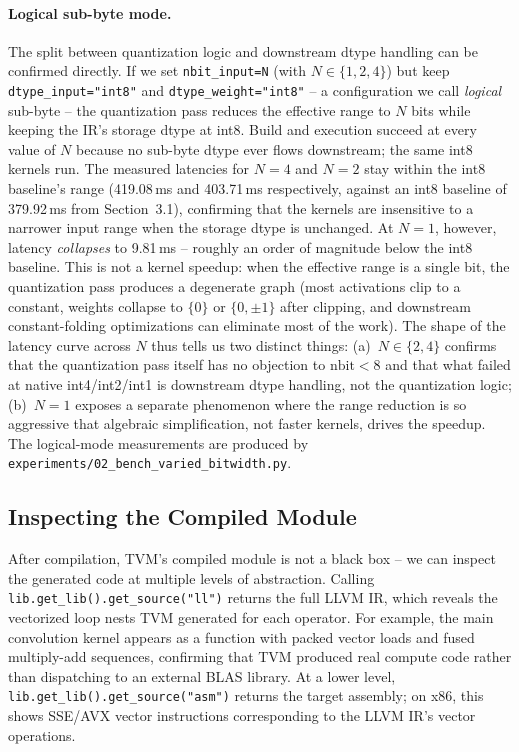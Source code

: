 \documentclass[11pt,a4paper]{article}
\begin{document}
\paragraph{Logical sub-byte mode.} The split between quantization logic and downstream dtype handling can be confirmed directly. If we set \texttt{nbit\_input=N} (with $N \in \{1,2,4\}$) but keep \texttt{dtype\_input="int8"} and \texttt{dtype\_weight="int8"} -- a configuration we call \emph{logical} sub-byte -- the quantization pass reduces the effective range to $N$ bits while keeping the IR's storage dtype at int8. Build and execution succeed at every value of $N$ because no sub-byte dtype ever flows downstream; the same int8 kernels run. The measured latencies for $N=4$ and $N=2$ stay within the int8 baseline's range (419.08\,ms and 403.71\,ms respectively, against an int8 baseline of 379.92\,ms from Section~3.1), confirming that the kernels are insensitive to a narrower input range when the storage dtype is unchanged. At $N=1$, however, latency \emph{collapses} to 9.81\,ms -- roughly an order of magnitude below the int8 baseline. This is not a kernel speedup: when the effective range is a single bit, the quantization pass produces a degenerate graph (most activations clip to a constant, weights collapse to $\{0\}$ or $\{0,\pm 1\}$ after clipping, and downstream constant-folding optimizations can eliminate most of the work). The shape of the latency curve across $N$ thus tells us two distinct things: (a)~$N \in \{2,4\}$ confirms that the quantization pass itself has no objection to $\mathrm{nbit} < 8$ and that what failed at native int4/int2/int1 is downstream dtype handling, not the quantization logic; (b)~$N = 1$ exposes a separate phenomenon where the range reduction is so aggressive that algebraic simplification, not faster kernels, drives the speedup. The logical-mode measurements are produced by \texttt{experiments/02\_bench\_varied\_bitwidth.py}.

\subsection{Inspecting the Compiled Module}

After compilation, TVM's compiled module is not a black box -- we can inspect the generated code at multiple levels of abstraction. Calling \texttt{lib.get\_lib().get\_source("ll")} returns the full LLVM IR, which reveals the vectorized loop nests TVM generated for each operator. For example, the main convolution kernel appears as a function with packed vector loads and fused multiply-add sequences, confirming that TVM produced real compute code rather than dispatching to an external BLAS library. At a lower level, \texttt{lib.get\_lib().get\_source("asm")} returns the target assembly; on x86, this shows SSE/AVX vector instructions corresponding to the LLVM IR's vector operations.
\end{document}
